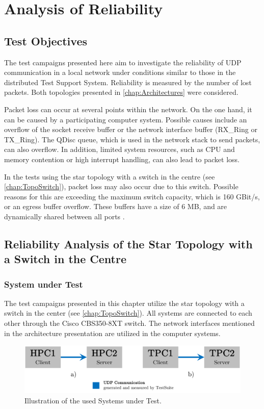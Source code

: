 \chapter{Analysis of Reliability}

\section{Test Objectives}

The test campaigns presented here aim to investigate the reliability of UDP communication in a local network under conditions similar to those in the distributed Test Support System. Reliability is measured by the number of lost packets. Both topologies presented in \ref{chap:Architectures} were considered.

Packet loss can occur at several points within the network. On the one hand, it can be caused by a participating computer system. Possible causes include an overflow of the socket receive buffer or the network interface buffer (RX\_Ring or TX\_Ring). The QDisc queue, which is used in the network stack to send packets, can also overflow. In addition, limited system resources, such as CPU and memory contention or high interrupt handling, can also lead to packet loss.

In the tests using the star topology with a switch in the centre (see \ref{chap:TopoSwitch}), packet loss may also occur due to this switch. Possible reasons for this are exceeding the maximum switch capacity, which is 160 GBit/s, or an egress buffer overflow. These buffers have a size of 6 MB, and are dynamically shared between all ports \cite{setup09}.

\section{Reliability Analysis of the Star Topology with a Switch in the Centre} \label{chap:switchtest}

\subsection{System under Test}
The test campaigns presented in this chapter utilize the star topology with a switch in the center (see \ref{chap:TopoSwitch}). All systems are connected to each other through the Cisco CBS350-8XT switch. The network interfaces mentioned in the architecture presentation are utilized in the computer systems.

\begin{figure}[h!]
    \centering
    \includegraphics[width=1\linewidth]{figures/reliability/star/rel_g_1.pdf}
    \caption{Illustration of the used Systems under Test.}
    \label{fig:sutreliability}
\end{figure}

